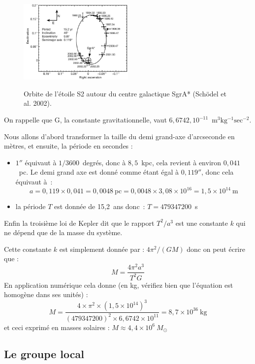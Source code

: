 \documentclass[a4paper,10pt]{report}
\renewcommand{\u}[1]{\ensuremath{\mathrm{#1}}} %
\begin{document}
\begin{figure}[htp]
  \centering
  \includegraphics[width=0.5\textwidth]{nature01121-f2_2}
  \label{centregalac}
  \caption{Orbite de l'étoile S2 autour du centre galactique SgrA*
    (Schödel et al. 2002).}
\end{figure}

\begin{Answer}
  On rappelle que G, la constante gravitationnelle, vaut
  $6,6742,10^{-11}$~\u{m^3kg^{-1}sec^{-2}}.

  Nous allons d'abord transformer la taille du demi grand-axe
  d'arcseconde en mètres, et ensuite, la période en secondes :
  \begin{itemize}
  \item $1''$ équivaut à $1/3600$~degrés, donc à $8,5$~kpc, cela
    revient à environ $0,041$~pc. Le demi grand axe est donné comme
    étant égal à $0,119''$, donc cela équivaut à~:
    $$
    a = 0,119 \times 0,041 = 0,0048~\u{pc} = 0,0048\times 3,08 \times
    10^{16} = 1,5 \times 10^{14}~\u{m}
    $$

  \item la période $T$ est donnée de 15,2~ans donc~: $T=479347200$~s
  \end{itemize}

  Enfin la troisième loi de Kepler dit que le rapport $T^2/a^3$ est une
  constante $k$ qui ne dépend que de la masse du système.

  Cette constante $k$ est simplement donnée par : $4\pi^2/(GM)$ donc on
  peut écrire que :
  $$
  M = \frac{4\pi^2 a^3}{T^2 G}
  $$
  En application numérique cela donne (en kg, vérifiez bien que
  l'équation est homogène dans ses unités) :
  $$
  M = \frac{ 4 \times \pi^2 \times (1,5 \times 10^{14})^3 } { (479 347
    200)^2 \times 6,6742 \times 10^{11} } = 8,7 \times 10^{36}~\u{kg}
  $$
  et ceci exprimé en masses solaires : $M \approx 4,4 \times
  10^6~M_{\odot}$
\end{Answer}

\subsection{Le groupe local}
\end{document}
